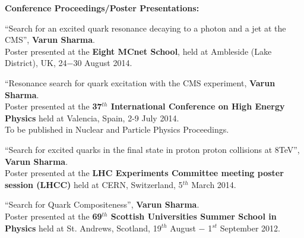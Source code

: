 %
\vspace{0.3cm}
{\Large \textbf{Conference Proceedings/Poster Presentations:}}
\begin{enumerate}
{%
\item ``Search for an excited quark resonance decaying to a photon and a jet at the CMS'', {\bf Varun Sharma}. \\
       Poster presented at the {\bf Eight MCnet School}, held at Ambleside (Lake District), UK, 24$-$30 August 2014.

\item ``Resonance search for quark excitation with the CMS experiment, {\bf Varun Sharma}. \\
       Poster presented at the {\bf 37$^{th}$ International Conference on High Energy Physics} held at Valencia, Spain, 2-9 July 2014. \\
       To be published in Nuclear and Particle Physics Proceedings.

\item ``Search for excited quarks in the \gamjet final state in proton proton collisions at 8\unit{TeV}'', {\bf Varun Sharma}. \\
       Poster presented at the {\bf LHC Experiments Committee meeting poster session (LHCC)} held at CERN, Switzerland, 5$^{th}$ March 2014. 

\item ``Search for Quark Compositeness'', {\bf Varun Sharma}. \\ 
       Poster presented at the {\bf 69$^{th}$ Scottish Universities Summer School in Physics} held at St. Andrews, Scotland, 19$^{th}$ August $-$ 1$^{st}$ September 2012.
}       
\end{enumerate}








